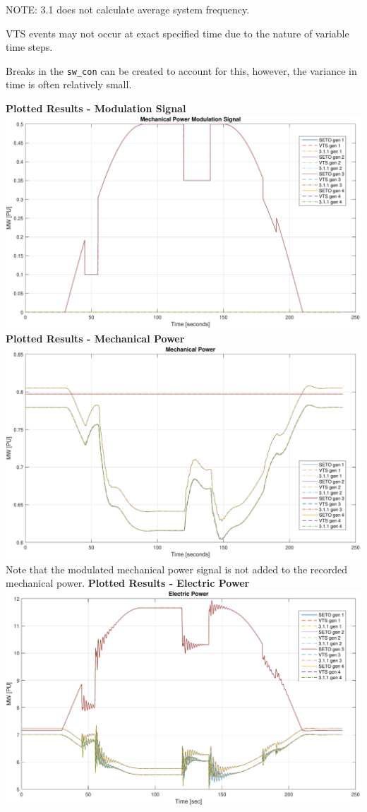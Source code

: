 NOTE: 3.1 does not calculate average system frequency.

VTS events may not occur at exact specified time due to the nature of variable time steps.

Breaks in the \verb|sw_con| can be created to account for this, however, the variance in time is often relatively small.


\pagebreak
\textbf{Plotted Results - Modulation Signal} \ \\
\includegraphics[width=\linewidth]{examples/extendedTerm/verPmSig}
\textbf{Plotted Results - Mechanical Power} \ \\
\includegraphics[width=\linewidth]{examples/extendedTerm/verPmech}
Note that the modulated mechanical power signal is not added to the recorded mechanical power.
\textbf{Plotted Results - Electric Power} \ \\
\includegraphics[width=\linewidth]{examples/extendedTerm/verPelect}

